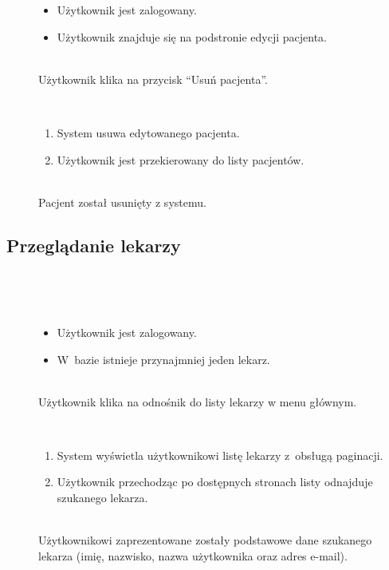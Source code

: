 \documentclass[11pt]{aghdpl}
\begin{document}
	\begin{description}
		\item[\useCaseAktor] \hfill \\
			\useCaseUzytkownik
		\item[\useCaseWarPocz] \hfill \\
			\begin{itemize}
				\item Użytkownik jest zalogowany.
				\item Użytkownik znajduje się na podstronie edycji pacjenta.
			\end{itemize}
		\item[\useCaseZdarzInicj] \hfill \\
			Użytkownik klika na przycisk ``Usuń pacjenta''.
		\item[\useCaseScenBaz] \hfill \\ 
			\begin{enumerate}
				\item System usuwa edytowanego pacjenta.
				\item Użytkownik jest przekierowany do listy pacjentów.
			\end{enumerate}
		\item[\useCaseWarKonc] \hfill \\ 
			Pacjent został usunięty z systemu.
	\end{description}

\subsection{Przeglądanie lekarzy}
	
	\begin{description}
		\item[\useCaseAktor] \hfill \\
			\useCaseUzytkownik
		\item[\useCaseWarPocz] \hfill \\
		\begin{itemize}
			\item Użytkownik jest zalogowany.
			\item W~bazie istnieje przynajmniej jeden lekarz.
		\end{itemize}
			
		\item[\useCaseZdarzInicj] \hfill \\
			Użytkownik klika na odnośnik do listy lekarzy w menu głównym.
		\item[\useCaseScenBaz] \hfill \\ 
			\begin{enumerate}
			\item System wyświetla użytkownikowi listę lekarzy z~obsługą paginacji.
			\item Użytkownik przechodząc po dostępnych stronach listy odnajduje szukanego lekarza.
			\end{enumerate}
		\item[\useCaseWarKonc] \hfill \\ 
			Użytkownikowi zaprezentowane zostały podstawowe dane szukanego lekarza (imię, nazwisko, nazwa użytkownika oraz adres e-mail).
	\end{description}
\end{document}
